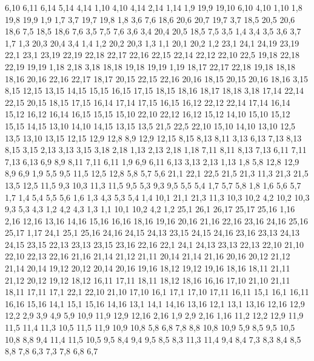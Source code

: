 6,10
6,11
6,14
5,14
4,14
%
1,10
4,10
4,14
2,14
1,14
%
1,9
19,9
19,10
6,10
4,10
1,10
%
1,8
19,8
19,9
1,9
%
1,7
3,7
19,7
19,8
1,8
%
3,6
7,6
18,6
20,6
20,7
19,7
3,7
%
18,5
20,5
20,6
18,6
%
7,5
18,5
18,6
7,6
%
3,5
7,5
7,6
3,6
%
3,4
20,4
20,5
18,5
7,5
3,5
%
1,4
3,4
3,5
3,6
3,7
1,7
%
1,3
20,3
20,4
3,4
1,4
%
1,2
20,2
20,3
1,3
%
1,1
20,1
20,2
1,2
23,1
24,1
24,19
23,19
%
22,1
23,1
23,19
22,19
22,18
22,17
22,16
22,15
22,14
22,12
22,10
22,5
%
19,18
22,18
22,19
19,19
%
1,18
2,18
3,18
18,18
19,18
19,19
1,19
%
18,17
22,17
22,18
19,18
18,18
%
18,16
20,16
22,16
22,17
18,17
%
20,15
22,15
22,16
20,16
%
18,15
20,15
20,16
18,16
%
3,15
8,15
12,15
13,15
14,15
15,15
16,15
17,15
18,15
18,16
18,17
18,18
3,18
%
17,14
22,14
22,15
20,15
18,15
17,15
%
16,14
17,14
17,15
16,15
%
16,12
22,12
22,14
17,14
16,14
%
15,12
16,12
16,14
16,15
15,15
%
15,10
22,10
22,12
16,12
15,12
%
14,10
15,10
15,12
15,15
14,15
%
13,10
14,10
14,15
13,15
%
13,5
21,5
22,5
22,10
15,10
14,10
13,10
%
12,5
13,5
13,10
13,15
12,15
12,9
12,8
%
8,9
12,9
12,15
8,15
8,13
8,11
%
3,13
6,13
7,13
8,13
8,15
3,15
%
2,13
3,13
3,15
3,18
2,18
%
1,13
2,13
2,18
1,18
%
7,11
8,11
8,13
7,13
%
6,11
7,11
7,13
6,13
%
6,9
8,9
8,11
7,11
6,11
%
1,9
6,9
6,11
6,13
3,13
2,13
1,13
%
1,8
5,8
12,8
12,9
8,9
6,9
1,9
%
5,5
9,5
11,5
12,5
12,8
5,8
5,7
5,6
%
21,1
22,1
22,5
21,5
21,3
%
11,3
21,3
21,5
13,5
12,5
11,5
%
9,3
10,3
11,3
11,5
9,5
%
5,3
9,3
9,5
5,5
5,4
%
1,7
5,7
5,8
1,8
%
1,6
5,6
5,7
1,7
%
1,4
5,4
5,5
5,6
1,6
%
1,3
4,3
5,3
5,4
1,4
%
10,1
21,1
21,3
11,3
10,3
10,2
%
4,2
10,2
10,3
9,3
5,3
4,3
%
1,2
4,2
4,3
1,3
%
1,1
10,1
10,2
4,2
1,2
25,1
26,1
26,17
25,17
25,16
%
1,16
2,16
12,16
13,16
14,16
15,16
16,16
18,16
19,16
20,16
21,16
22,16
23,16
24,16
25,16
25,17
1,17
%
24,1
25,1
25,16
24,16
24,15
24,13
%
23,15
24,15
24,16
23,16
%
23,13
24,13
24,15
23,15
%
22,13
23,13
23,15
23,16
22,16
%
22,1
24,1
24,13
23,13
22,13
22,10
%
21,10
22,10
22,13
22,16
21,16
21,14
21,12
21,11
%
20,14
21,14
21,16
20,16
%
20,12
21,12
21,14
20,14
%
19,12
20,12
20,14
20,16
19,16
%
18,12
19,12
19,16
18,16
%
18,11
21,11
21,12
20,12
19,12
18,12
%
16,11
17,11
18,11
18,12
18,16
16,16
%
17,10
21,10
21,11
18,11
17,11
%
17,1
22,1
22,10
21,10
17,10
%
16,1
17,1
17,10
17,11
16,11
%
15,1
16,1
16,11
16,16
15,16
%
14,1
15,1
15,16
14,16
%
13,1
14,1
14,16
13,16
%
12,1
13,1
13,16
12,16
12,9
12,2
%
2,9
3,9
4,9
5,9
10,9
11,9
12,9
12,16
2,16
%
1,9
2,9
2,16
1,16
%
11,2
12,2
12,9
11,9
11,5
11,4
11,3
%
10,5
11,5
11,9
10,9
10,8
%
5,8
6,8
7,8
8,8
10,8
10,9
5,9
%
8,5
9,5
10,5
10,8
8,8
%
9,4
11,4
11,5
10,5
9,5
%
8,4
9,4
9,5
8,5
%
8,3
11,3
11,4
9,4
8,4
%
7,3
8,3
8,4
8,5
8,8
7,8
%
6,3
7,3
7,8
6,8
6,7
